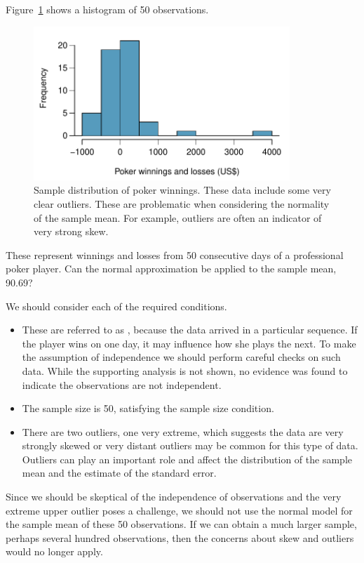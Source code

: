 \begin{example}{Figure~\ref{pokerProfitsCanApplyNormalToSampMean} shows a histogram of 50 observations. 


\begin{figure}[H]
   \centering
   \includegraphics[height=58mm]{04/figures/pokerProfitsCanApplyNormalToSampMean/pokerProfitsCanApplyNormalToSampMean}
   \caption{Sample distribution of poker winnings. These data include some very clear outliers. These are problematic when considering the normality of the sample mean. For example, outliers are often an indicator of very strong skew.}
   \label{pokerProfitsCanApplyNormalToSampMean}
\end{figure}



These represent winnings and losses from 50 consecutive days of a professional poker player. Can the normal approximation be applied to the sample mean, 90.69?}
We should consider each of the required conditions.
\begin{itemize}
\setlength{\itemsep}{0mm}
\item[(1)] These are referred to as , because the data arrived in a particular sequence. If the player wins on one day, it may influence how she plays the next. To make the assumption of independence we should perform careful checks on such data. While the supporting analysis is not shown, no evidence was found to indicate the observations are not independent.
\item[(2)] The sample size is 50, satisfying the sample size condition.
\item[(3)] There are two outliers, one very extreme, which suggests the data are very strongly skewed or very distant outliers may be common for this type of data. Outliers can play an important role and affect the distribution of the sample mean and the estimate of the standard error.
\end{itemize}
Since we should be skeptical of the independence of observations and the very extreme upper outlier poses a challenge, we should not use the normal model for the sample mean of these 50 observations. If we can obtain a much larger sample, perhaps several hundred observations, then the concerns about skew and outliers would no longer apply.
\end{example}

